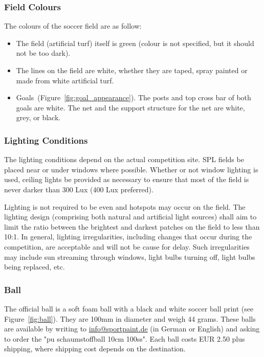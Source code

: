 \subsubsection{Field Colours}
\label{sec:field_colors}
The colours of the soccer field are as follow:

\begin{itemize}
	\item The field (artificial turf) itself is green (colour is not specified, but it should not be too dark).
	
	\item The lines on the field are white, whether they are taped, spray painted or made from white artificial turf.
	
	\item Goals~(\cf Figure~\ref{fig:goal_appearance}). The posts and top cross bar of both goals are white. The net and the support structure for the net are white, grey, or black.
\end{itemize}

\subsubsection{Lighting Conditions}
\label{sec:lightConditions}
The lighting conditions depend on the actual competition site. SPL fields  be placed near or under windows where possible. Whether or not window lighting is used, ceiling lights  be provided as necessary to ensure that most of the field is never darker than 300 Lux (400 Lux preferred).

Lighting is not required to be even and hotspots may occur on the field. The lighting design (comprising both natural and artificial light sources) shall aim to limit the ratio between the brightest and darkest patches on the field to less than 10:1. In general, lighting irregularities, including changes that occur during the competition, are acceptable and will not be cause for delay. Such irregularities may include sun streaming through windows, light bulbs turning off, light bulbs being replaced, etc.

\subsubsection{Ball}
\label{sec:ball}

The official ball is a soft foam ball with a black and white soccer ball print (see Figure~\ref{fig:ball}). They are 100mm in diameter and weigh 44 grams. These balls are available by writing to \url{info@sportpaint.de} (in German or English) and asking to order the "pu schaumstoffball 10cm 100ss".  Each ball costs EUR 2.50 plus shipping, where shipping cost depends on the destination.

